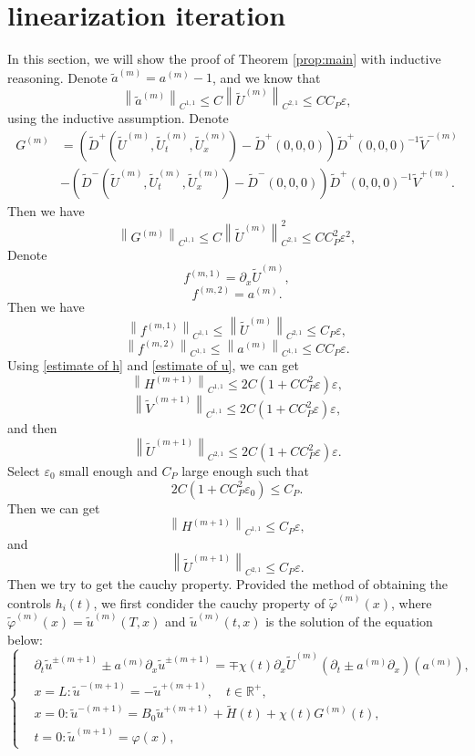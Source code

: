 \documentclass[a4paper,reqno,11pt]{amsart}
\numberwithin{equation}{section} %
\begin{document}
\section{linearization iteration}
In this section, we will show the proof of Theorem \ref{prop:main} with inductive reasoning. Denote $\tilde{a}^{(m)}=a^{(m)}-1$, and we know that
$$
\left\| \tilde{a}^{(m)} \right\| _{C^{1,1}}\leq C\left\| \tilde{U}^{(m)} \right\| _{C^{2,1}}\leq CC_P\varepsilon ,
$$
using the inductive assumption.
Denote
$$
\begin{aligned}
	G^{(m)} &=\left(\widetilde{D}^{+}\left(\widetilde{U}^{(m)}, \widetilde{U}_t^{(m)}, \widetilde{U}_x^{(m)}\right)-\widetilde{D}^{+}(0,0,0)\right) \widetilde{D}^{+}(0,0,0)^{-1} \widetilde{V}^{-(m)} \\
		& -\left(\widetilde{D}^{-}\left(\widetilde{U}^{(m)}, \widetilde{U}_t^{(m)}, \widetilde{U}_x^{(m)}\right)-\widetilde{D}^{-}(0,0,0)\right) \widetilde{D}^{+}(0,0,0)^{-1} \widetilde{V}^{+(m)}.
\end{aligned}
$$
Then we have
$$
\left\| G^{(m)} \right\| _{C^{1,1}}\leq C\left\| \tilde{U}^{(m)} \right\| _{C^{2,1}}^{2}\leq CC_{P}^{2}\varepsilon ^2,
$$
Denote
$$
f^{(m,1)}=\partial _x\tilde{U}^{(m)},
$$
$$
f^{\left( m,2 \right)}=a^{\left( m \right)}.
$$
Then we have
$$
\left\| f^{(m,1)} \right\| _{C^{1,1}}\le \left\| \tilde{U}^{(m)} \right\| _{C^{2,1}}\leq C_P\varepsilon ,
$$
$$
\left\| f^{(m,2)} \right\| _{C^{1,1}}\le \left\| a^{\left( m \right)} \right\| _{C^{1,1}}\leq CC_P\varepsilon .
$$
Using \eqref{estimate of h} and \eqref{estimate of u}, we can get
$$
\left\| H^{(m+1)} \right\| _{C^{1,1}}\leq 2C\left( 1+CC_{P}^{2}\varepsilon \right) \varepsilon, 
$$
$$
\left\| \tilde{V}^{(m+1)} \right\| _{C^{1,1}} \leq 2C\left( 1+CC_{P}^{2}\varepsilon \right) \varepsilon ,
$$
and then
$$
\left\| \tilde{U}^{(m+1)} \right\| _{C^{2,1}} \leq 2C\left( 1+CC_{P}^{2}\varepsilon \right) \varepsilon .
$$
Select $\varepsilon _0$ small enough and $C_P$ large enough such that
$$
2C\left( 1+CC_{P}^{2}\varepsilon _0 \right) \leq C_P.
$$
Then we can get
$$
\left\| H^{(m+1)} \right\| _{C^{1,1}}\leq C_P\varepsilon,
$$
and
$$
\left\| \tilde{U}^{(m+1)} \right\| _{C^{2,1}}\leq C_P\varepsilon.
$$
Then we try to get the cauchy property. Provided the method of obtaining the controls $h_i(t)$, we first condider the cauchy property of $\tilde{\varphi }^{(m)}(x)$, where $\tilde{\varphi }^{(m)}(x)=\tilde{u}^{(m)}(T,x)$ and $\tilde{u}^{(m)}(t,x)$ is the solution of the equation below:
$$
\begin{cases}
	&		\partial _t\widetilde{u}^{\pm (m+1)}\pm a^{(m)}\partial _x\widetilde{u}^{\pm (m+1)}=\mp \chi \left( t \right) \partial _x\widetilde{U}^{(m)}\left( \partial _t\pm a^{(m)}\partial _x \right) \left( a^{(m)} \right) ,\\
	&		x=L:\widetilde{u}^{-(m+1)}=-\widetilde{u}^{+(m+1)},\quad t\in \mathbb{R} ^+,\\
	&		x=0:\widetilde{u}^{-(m+1)}=B_0\widetilde{u}^{+(m+1)}+\widetilde{H}(t)+\chi \left( t \right)G^{\left( m \right)}\left( t \right) ,\\
	&		t=0:\widetilde{u}^{(m+1)}=\varphi \left( x \right) ,
\end{cases}
$$
\end{document}
